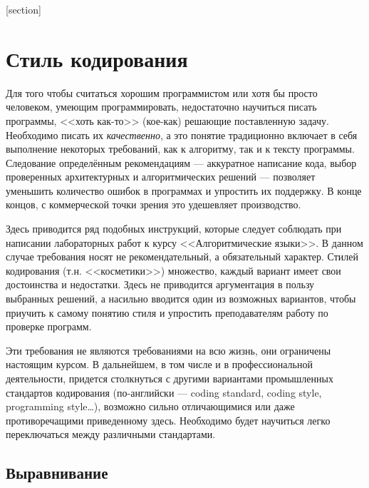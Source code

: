 [section]
\newcommand{\zzstyleitem}{\refstepcounter{zzstyleicnt}\paragraph{Пункт \arabic{section}.\thezzstyleicnt}}

\chapter{Стиль кодирования}

Для того чтобы считаться хорошим программистом или хотя бы просто
человеком, умеющим программировать, недостаточно научиться писать
программы, <<хоть как-то>> (кое-как) решающие поставленную задачу.
Необходимо писать их \emph{качественно}, а это понятие традиционно
включает в себя выполнение некоторых требований, как к алгоритму, так и
к тексту программы. Следование определённым рекомендациям --- аккуратное
написание кода, выбор проверенных архитектурных и алгоритмических
решений --- позволяет уменьшить количество ошибок в программах и
упростить их поддержку. В конце концов, с коммерческой точки зрения это
удешевляет производство.

Здесь приводится ряд подобных инструкций, которые следует соблюдать при
написании лабораторных работ к курсу <<Алгоритмические языки>>. В данном
случае требования носят не рекомендательный, а обязательный характер.
Стилей кодирования (т.н. <<косметики>>) множество, каждый вариант имеет
свои достоинства и недостатки. Здесь не приводится аргументация в пользу
выбранных решений, а насильно вводится один из возможных вариантов,
чтобы приучить к самому понятию стиля и упростить преподавателям работу
по проверке программ.

Эти требования не являются требованиями на всю жизнь, они ограничены
настоящим курсом. В дальнейшем, в том числе и в профессиональной
деятельности, придется столкнуться с другими вариантами промышленных
стандартов кодирования (по-английски --- coding standard, coding style,
programming style\ldots{}), возможно сильно отличающимися или даже
противоречащими приведенному здесь. Необходимо будет научиться легко
переключаться между различными стандартами.


\section{Выравнивание}

